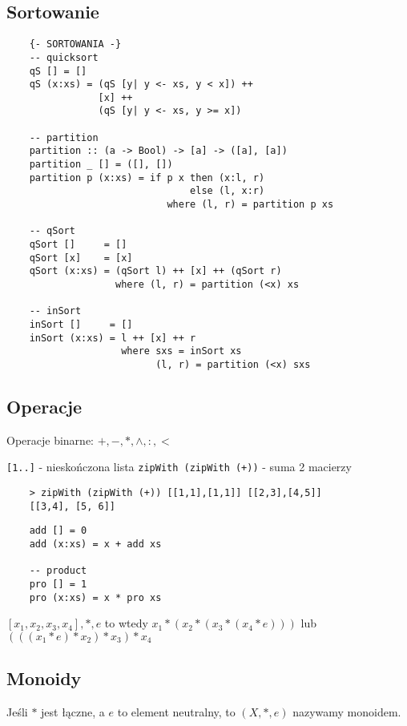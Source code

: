 \documentclass{article}
\begin{document}
\subsection{Sortowanie}

\begin{verbatim}
    {- SORTOWANIA -}
    -- quicksort
    qS [] = []
    qS (x:xs) = (qS [y| y <- xs, y < x]) ++
                [x] ++
                (qS [y| y <- xs, y >= x])
    
    -- partition
    partition :: (a -> Bool) -> [a] -> ([a], [a])
    partition _ [] = ([], [])
    partition p (x:xs) = if p x then (x:l, r)
                                else (l, x:r)
                            where (l, r) = partition p xs

    -- qSort 
    qSort []     = []
    qSort [x]    = [x]
    qSort (x:xs) = (qSort l) ++ [x] ++ (qSort r)
                   where (l, r) = partition (<x) xs
    
    -- inSort
    inSort []     = []
    inSort (x:xs) = l ++ [x] ++ r
                    where sxs = inSort xs
                          (l, r) = partition (<x) sxs
\end{verbatim}

\subsection{Operacje}

Operacje binarne: $+, -, *, \wedge, :, <$

\texttt{[1..]} - nieskończona lista
\texttt{zipWith (zipWith (+))} - suma 2 macierzy
\begin{verbatim}
    > zipWith (zipWith (+)) [[1,1],[1,1]] [[2,3],[4,5]]
    [[3,4], [5, 6]]
\end{verbatim}

\begin{verbatim}
    add [] = 0
    add (x:xs) = x + add xs
    
    -- product
    pro [] = 1
    pro (x:xs) = x * pro xs
\end{verbatim}

$[x_1, x_2, x_3, x_4], *, e $ to wtedy
$x_1 * (x_2 * (x_3 * (x_4 * e)))$ lub $(((x_1 * e) * x_2) * x_3) *x_4$

\subsection{Monoidy}

Jeśli $*$ jest łączne, a $e$ to element neutralny, to $(X, *, e)$ nazywamy monoidem.
\end{document}
